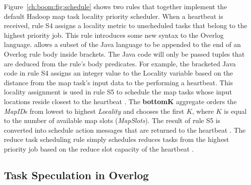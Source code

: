 Figure~\ref{ch:boom:fig:schedule} shows two rules that together implement the default Hadoop map task locality priority scheduler.
When a \TT heartbeat is received, rule S4 assigns a locality metric to unscheduled tasks that belong to the highest priority job.
This rule introduces some new syntax to the Overlog language. \JOL allows a subset of the Java language to be appended to the
end of an Overlog rule body inside brackets. The Java code will only be passed tuples that are deduced from the rule's body predicates.
For example, the bracketed Java code in rule S4 assigns an integer value to the Locality variable based on the distance from the map task's input data to the 
\TT performing a heartbeat. This locality assignment is used in rule S5 to schedule the map tasks whose input locations reside closest to 
the heartbeat \TT. The {\bf bottomK} aggregate orders the {\em MapID}s from lowest to highest {\em Locality} and chooses the first $K$, where
$K$ is equal to the number of available map slots ({\em MapSlots}). The result of rule S5 is converted into schedule action messages that are 
returned to the heartbeat \TT. The reduce task scheduling rule simply schedules reduces tasks from the highest priority job based on
the reduce slot capacity of the heartbeat \TT. 

\subsection{Task Speculation in Overlog}

